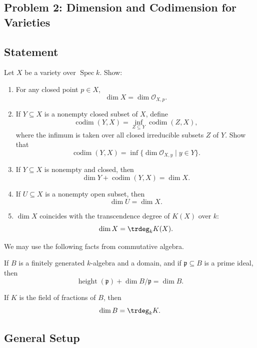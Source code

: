 
\subsection*{Problem 2: Dimension and Codimension for Varieties}

\subsection*{Statement}

Let \(X\) be a variety over \(\operatorname{Spec} k\). Show:

\begin{enumerate}[label=(\alph*)]
	\item For any closed point \(p\in X\),
	\[
	\dim X=\dim \mathcal O_{X,p}.
	\]
	
	\item If \(Y\subseteq X\) is a nonempty closed subset of \(X\), define
	\[
	\operatorname{codim}(Y,X)
	=
	\inf_{Z\subseteq Y}\operatorname{codim}(Z,X),
	\]
	where the infimum is taken over all closed irreducible subsets \(Z\) of \(Y\). Show that
	\[
	\operatorname{codim}(Y,X)
	=
	\inf\{\dim \mathcal O_{X,y}\mid y\in Y\}.
	\]
	
	\item If \(Y\subseteq X\) is nonempty and closed, then
	\[
	\dim Y+\operatorname{codim}(Y,X)=\dim X.
	\]
	
	\item If \(U\subseteq X\) is a nonempty open subset, then
	\[
	\dim U=\dim X.
	\]
	
	\item \(\dim X\) coincides with the transcendence degree of \(K(X)\) over \(k\):
	\[
	\dim X=\trdeg_k K(X).
	\]
\end{enumerate}

We may use the following facts from commutative algebra.

If \(B\) is a finitely generated \(k\)-algebra and a domain, and if \(\mathfrak p\subseteq B\) is a prime ideal, then
\[
\operatorname{height}(\mathfrak p)+\dim B/\mathfrak p=\dim B.
\]

If \(K\) is the field of fractions of \(B\), then
\[
\dim B=\trdeg_k K.
\]

\subsection*{General Setup}

